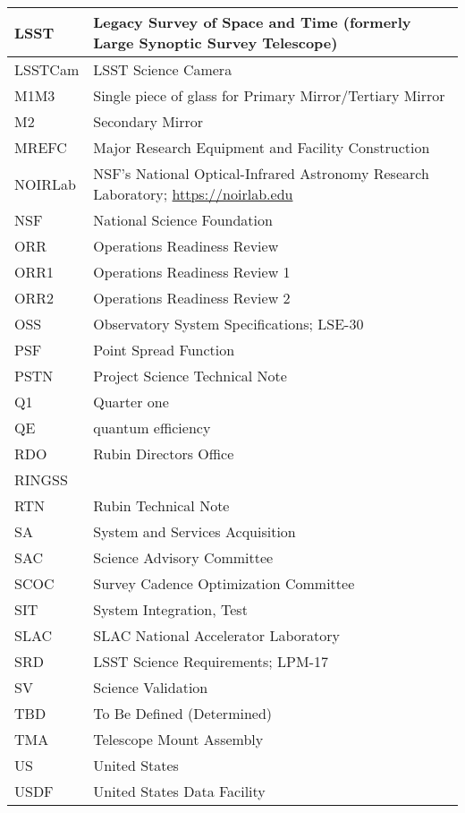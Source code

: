 \begin{longtable}{p{}p{}}
LSST & Legacy Survey of Space and Time (formerly Large Synoptic Survey Telescope) \\\hline
LSSTCam & LSST Science Camera \\\hline
M1M3 & Single piece of glass for Primary Mirror/Tertiary Mirror \\\hline
M2 & Secondary Mirror \\\hline
MREFC & Major Research Equipment and Facility Construction \\\hline
NOIRLab & NSF's National Optical-Infrared Astronomy Research Laboratory; \url{https://noirlab.edu} \\\hline
NSF & National Science Foundation \\\hline
ORR & Operations Readiness Review \\\hline
ORR1 & Operations Readiness Review 1 \\\hline
ORR2 & Operations Readiness Review 2 \\\hline
OSS & Observatory System Specifications; LSE-30 \\\hline
PSF & Point Spread Function \\\hline
PSTN & Project Science Technical Note \\\hline
Q1 & Quarter one \\\hline
QE & quantum efficiency \\\hline
RDO & Rubin Directors Office \\\hline
RINGSS &  \\\hline
RTN & Rubin Technical Note \\\hline
SA & System and Services Acquisition \\\hline
SAC & Science Advisory Committee \\\hline
SCOC & Survey Cadence Optimization Committee \\\hline
SIT & System Integration, Test \\\hline
SLAC & SLAC National Accelerator Laboratory \\\hline
SRD & LSST Science Requirements; LPM-17 \\\hline
SV & Science Validation \\\hline
TBD & To Be Defined (Determined) \\\hline
TMA & Telescope Mount Assembly \\\hline
US & United States \\\hline
USDF & United States Data Facility \\\hline
\end{longtable}
